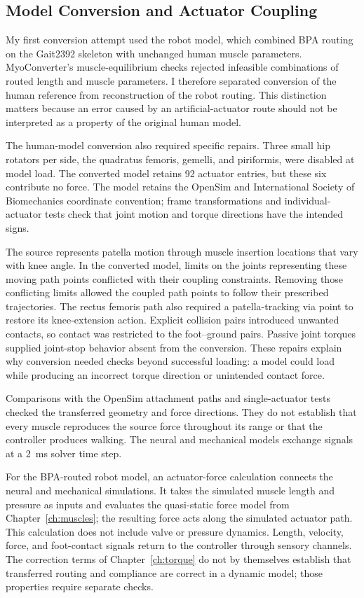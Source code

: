 \subsection{Model Conversion and Actuator Coupling}\label{sec:sns_existing_tools}

My first conversion attempt used the robot model, which combined BPA routing on the Gait2392 skeleton with unchanged human muscle parameters. MyoConverter's muscle-equilibrium checks rejected infeasible combinations of routed length and muscle parameters. I therefore separated conversion of the human reference from reconstruction of the robot routing. This distinction matters because an error caused by an artificial-actuator route should not be interpreted as a property of the original human model.

The human-model conversion also required specific repairs. Three small hip rotators per side, the quadratus femoris, gemelli, and piriformis, were disabled at model load. The converted model retains 92 actuator entries, but these six contribute no force. The model retains the OpenSim and International Society of Biomechanics coordinate convention; frame transformations and individual-actuator tests check that joint motion and torque directions have the intended signs.

The source represents patella motion through muscle insertion locations that vary with knee angle. In the converted model, limits on the joints representing these moving path points conflicted with their coupling constraints. Removing those conflicting limits allowed the coupled path points to follow their prescribed trajectories. The rectus femoris path also required a patella-tracking via point to restore its knee-extension action. Explicit collision pairs introduced unwanted contacts, so contact was restricted to the foot--ground pairs. Passive joint torques supplied joint-stop behavior absent from the conversion. These repairs explain why conversion needed checks beyond successful loading: a model could load while producing an incorrect torque direction or unintended contact force.

Comparisons with the OpenSim attachment paths and single-actuator tests checked the transferred geometry and force directions. They do not establish that every muscle reproduces the source force throughout its range or that the controller produces walking. The neural and mechanical models exchange signals at a \qty{2}{\milli\second} solver time step.

For the BPA-routed robot model, an actuator-force calculation connects the neural and mechanical simulations. It takes the simulated muscle length and pressure as inputs and evaluates the quasi-static force model from Chapter~\ref{ch:muscles}; the resulting force acts along the simulated actuator path. This calculation does not include valve or pressure dynamics. Length, velocity, force, and foot-contact signals return to the controller through sensory channels. The correction terms of Chapter~\ref{ch:torque} do not by themselves establish that transferred routing and compliance are correct in a dynamic model; those properties require separate checks.


